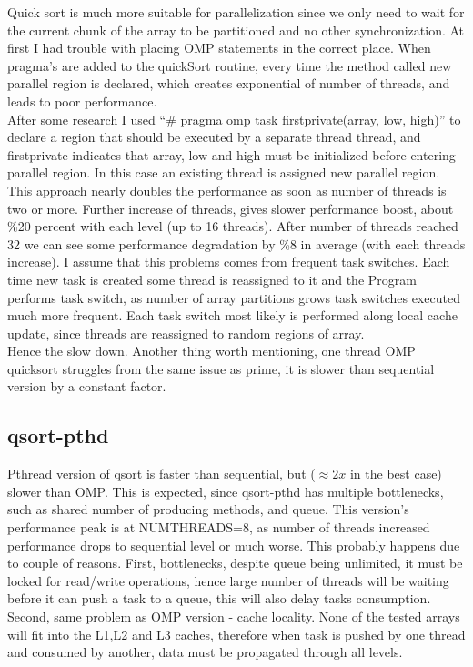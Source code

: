 \documentclass{article}
\begin{document}
Quick sort is much more suitable for parallelization since we only need to wait for the
current chunk of the array to be partitioned and no other synchronization. At first I had
trouble with placing OMP statements in the correct place. When pragma's are added to the
quickSort routine, every time the method called new parallel region is declared, which
creates exponential of number of threads, and leads to poor performance. \\

After some research I used ``\# pragma omp task firstprivate(array, low, high)'' to declare a
region that should be executed by a separate thread thread, and firstprivate indicates that 
array, low and high must be initialized before entering parallel region. In this case an
existing thread is assigned new parallel region. \\

This approach nearly doubles the performance as soon as number of threads is two or more.
Further increase of threads, gives slower performance boost, about \%20 percent with each
level (up to 16 threads). After number of threads reached 32 we can see some performance
degradation by \%8 in average (with each threads increase). I assume that this problems comes
from frequent task switches. Each time new task is created some thread is reassigned to it and 
the Program performs task switch, as number of array partitions grows task switches executed
much more frequent. Each task switch most likely is performed along local cache update, since
threads are reassigned to random regions of array. \\
Hence the slow down.
Another thing worth mentioning, one thread OMP quicksort struggles from the same issue as 
prime, it is slower than sequential version by a constant factor.

\subsection{\textbf{qsort-pthd}}

Pthread version of qsort is faster than sequential, but ($\approx 2x$ in the best case) slower 
than OMP. This is expected, since qsort-pthd has multiple bottlenecks, such as shared number
of producing methods, and queue. This version's performance peak is at NUMTHREADS=8, as
number of threads increased performance drops to sequential level or much worse. This probably
happens due to couple of reasons. First, bottlenecks, despite queue being unlimited, 
it must be locked for read/write operations, hence large number of threads will be waiting
before it can push a task to a queue, this will also delay tasks consumption. Second, same
problem as OMP version - cache locality. None of the tested arrays will fit into the L1,L2
and L3 caches, therefore when task is pushed by one thread and consumed by another, data must
be propagated through all levels.
\end{document}
